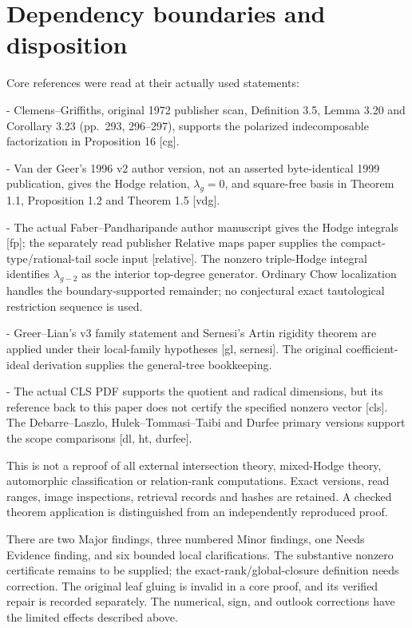 \documentclass[10pt]{article}
\begin{document}
\section*{Dependency boundaries and disposition}
Core references were read at their actually used statements:\par
- Clemens–Griffiths, original 1972 publisher scan, Definition 3.5, Lemma 3.20 and Corollary 3.23 (pp. 293, 296–297), supports the polarized indecomposable factorization in Proposition 16 [cg].\par
- Van der Geer’s 1996 v2 author version, not an asserted byte-identical 1999 publication, gives the Hodge relation, \(\lambda_g=0\), and square-free basis in Theorem 1.1, Proposition 1.2 and Theorem 1.5 [vdg].\par
- The actual Faber–Pandharipande author manuscript gives the Hodge integrals [fp]; the separately read publisher Relative maps paper supplies the compact-type/rational-tail socle input [relative]. The nonzero triple-Hodge integral identifies \(\lambda_{g-2}\) as the interior top-degree generator. Ordinary Chow localization handles the boundary-supported remainder; no conjectural exact tautological restriction sequence is used.\par
- Greer–Lian’s v3 family statement and Sernesi’s Artin rigidity theorem are applied under their local-family hypotheses [gl, sernesi]. The original coefficient-ideal derivation supplies the general-tree bookkeeping.\par
- The actual CLS PDF supports the quotient and radical dimensions, but its reference back to this paper does not certify the specified nonzero vector [cls]. The Debarre–Laszlo, Hulek–Tommasi–Taibi and Durfee primary versions support the scope comparisons [dl, ht, durfee].\par
This is not a reproof of all external intersection theory, mixed-Hodge theory, automorphic classification or relation-rank computations. Exact versions, read ranges, image inspections, retrieval records and hashes are retained. A checked theorem application is distinguished from an independently reproduced proof.\par
There are two Major findings, three numbered Minor findings, one Needs Evidence finding, and six bounded local clarifications. The substantive nonzero certificate remains to be supplied; the exact-rank/global-closure definition needs correction. The original leaf gluing is invalid in a core proof, and its verified repair is recorded separately. The numerical, sign, and outlook corrections have the limited effects described above.\par
\end{document}
